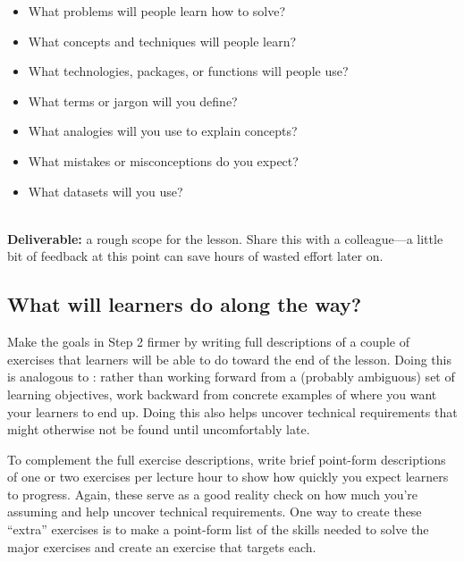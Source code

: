\begin{itemize}

\item
  What problems will people learn how to solve?

\item
  What concepts and techniques will people learn?

\item
  What technologies, packages, or functions will people use?

\item
  What terms or jargon will you define?

\item
  What analogies will you use to explain concepts?

\item
  What mistakes or misconceptions do you expect?

\item
  What datasets will you use?

\end{itemize}

~\\
\noindent
\textbf{Deliverable:}
a rough scope for the lesson.
Share this with a colleague---a little bit of feedback at this point
can save hours of wasted effort later on.

\subsection*{What will learners do along the way?}

Make the goals in Step 2 firmer by writing full descriptions of
a couple of exercises that learners will be able to do toward the end of the lesson.
Doing this is analogous to :
rather than working forward from a (probably ambiguous) set of learning objectives,
work backward from concrete examples of where you want your learners to end up.
Doing this also helps uncover technical requirements
that might otherwise not be found until uncomfortably late.

To complement the full exercise descriptions,
write brief point-form descriptions of one or two exercises per lecture hour
to show how quickly you expect learners to progress.
Again,
these serve as a good reality check on how much you're assuming
and help uncover technical requirements.
One way to create these ``extra'' exercises
is to make a point-form list of the skills needed to solve the major exercises
and create an exercise that targets each.

